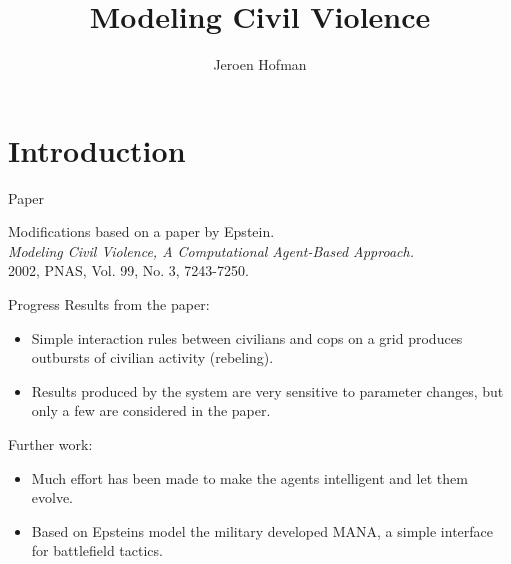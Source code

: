 \documentclass[red]{beamer}
\title
{Modeling Civil Violence
}
\author
{Jeroen Hofman}
\institute
{
 Department of Computational Science\\
 University of Amsterdam}
\begin{document}
\graphicspath{{/home/jhofman/Desktop/CSS/Figures/}}

\begin{frame}
  \titlepage
\end{frame}

\section{Introduction}

\begin{frame}{Paper}
  \begin{center}
  \Large{
  Modifications based on a paper by Epstein. \\
  \vspace{10pt}
  \emph{Modeling Civil Violence, A Computational Agent-Based Approach.} \\}
\vspace{10pt}
\small{2002, PNAS, Vol. 99, No. 3, 7243-7250.}
  \end{center}
\end{frame}

\begin{frame}{Progress}
  Results from the paper:
  \begin{itemize}
  \item
    Simple interaction rules between civilians and cops on a grid produces outbursts of civilian activity (rebeling).
  \item
    Results produced by the system are very sensitive to parameter changes, but only a few are considered in the paper.
  \end{itemize}

  Further work:
  \begin{itemize}
  \item
    Much effort has been made to make the agents intelligent and let them evolve.
  \item
    Based on Epsteins model the military developed MANA, a simple interface for battlefield tactics.
  \end{itemize}

  \let\thefootnote\relax{}
  \let\thefootnote\relax{}
\end{frame}
\end{document}
